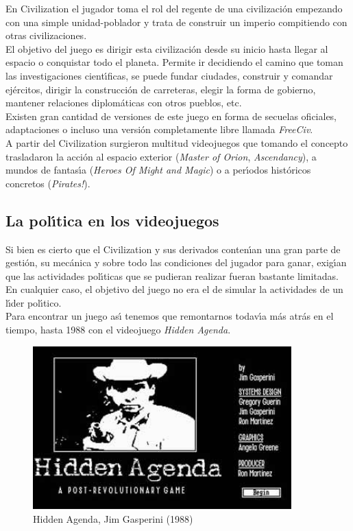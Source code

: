En Civilization el jugador toma el rol del regente de una civilizaci\'on empezando con una simple unidad-poblador y trata de construir un imperio compitiendo con otras civilizaciones.\\

El objetivo del juego es dirigir esta civilizaci\'on desde su inicio hasta llegar al espacio o conquistar todo el planeta. Permite ir decidiendo el camino que toman las investigaciones cient\'{\i}ficas,  se puede fundar ciudades, construir y comandar ej\'ercitos, dirigir la construcci\'on de carreteras, elegir la forma de gobierno, mantener relaciones diplom\'aticas con otros pueblos, etc.\\

Existen gran cantidad de versiones de este juego en forma de secuelas oficiales, adaptaciones o incluso una versi\'on completamente libre llamada \emph{FreeCiv}.\\

A partir del Civilization surgieron multitud videojuegos que tomando el concepto trasladaron la acci\'on al espacio exterior (\emph{Master of Orion}, \emph{Ascendancy}), a mundos de fantas\'{\i}a (\emph{Heroes Of Might and Magic}) o a per\'{\i}odos hist\'oricos concretos (\emph{Pirates!}).\\

\subsection{La pol\'{\i}tica en los videojuegos}

Si bien es cierto que el Civilization y sus derivados conten\'{\i}an una gran parte de gesti\'on, su mec\'anica y sobre todo las condiciones del jugador para ganar, exig\'{\i}an que las actividades pol\'{\i}ticas que se pudieran realizar fueran bastante limitadas. En cualquier caso, el objetivo del juego no era el de simular la actividades de un l\'{\i}der pol\'{\i}tico.\\

Para encontrar un juego as\'{\i} tenemos que remontarnos todav\'{\i}a m\'as atr\'as en el tiempo, hasta 1988 con el videojuego \emph{Hidden Agenda}.\\

\begin{figure}[h]
	\centering
		\includegraphics[width=10cm]{images/hiddenAgenda.png}
	\caption{Hidden Agenda, Jim Gasperini (1988)}
	\label{fig:Pantalla inicial de Hidden Agenda}
\end{figure}		
	
